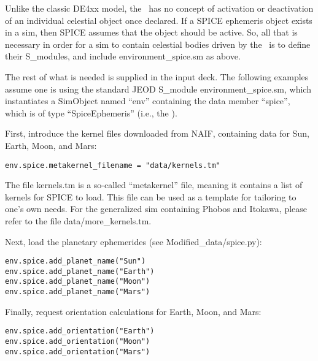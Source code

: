 Unlike the classic DE4xx model, the \SpiceDesc\ has no concept of activation
or deactivation of an individual celestial object once declared.  If a
SPICE ephemeris object exists in a sim, then SPICE assumes that the object
should be active.  So, all that is necessary in order for a sim to contain
celestial bodies driven by the \SpiceDesc\ is to define their S\_modules,
and include environment\_spice.sm as above.

The rest of what is needed is supplied in the input deck. The following
examples assume one is using the standard JEOD S\_module environment\_spice.sm,
which instantiates a SimObject named ``env'' containing the data member
``spice'', which is of type ``SpiceEphemeris'' (i.e., the \SpiceDesc).

First, introduce the kernel files downloaded from NAIF, containing data
for Sun, Earth, Moon, and Mars:
\begin{verbatim}
env.spice.metakernel_filename = "data/kernels.tm"
\end{verbatim}
The file kernels.tm is a so-called ``metakernel'' file, meaning it contains
a list of kernels for SPICE to load. This file can be used as a template for
tailoring to one's own needs.  For the generalized sim containing Phobos and
Itokawa, please refer to the file data/more\_kernels.tm.

Next, load the planetary ephemerides (see Modified\_data/spice.py):
\begin{verbatim}
env.spice.add_planet_name("Sun")
env.spice.add_planet_name("Earth")
env.spice.add_planet_name("Moon")
env.spice.add_planet_name("Mars")
\end{verbatim}

Finally, request orientation calculations for Earth, Moon, and Mars:
\begin{verbatim}
env.spice.add_orientation("Earth")
env.spice.add_orientation("Moon")
env.spice.add_orientation("Mars")
\end{verbatim}
